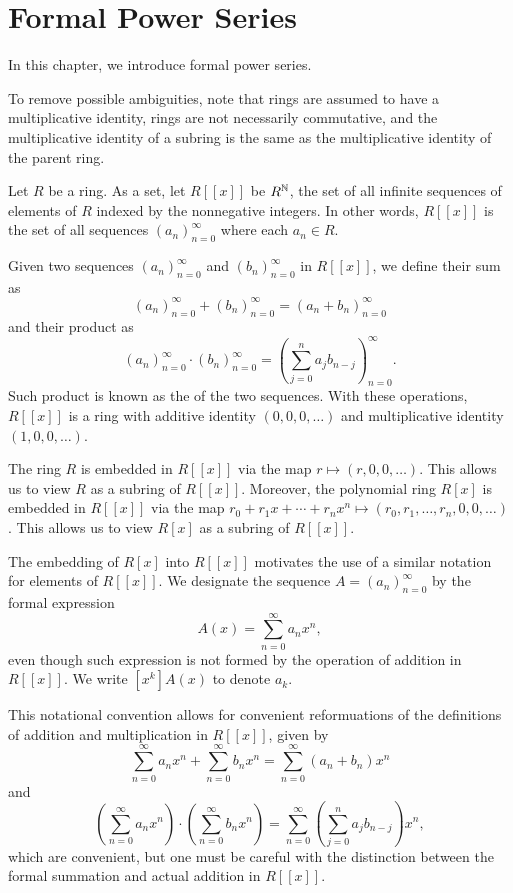 \chapter{Formal Power Series}

In this chapter, we introduce formal power series.

To remove possible ambiguities,
note that
rings are assumed to have a multiplicative identity,
rings are not necessarily commutative, and
the multiplicative identity of a subring is the same as the multiplicative identity of the parent ring.

Let \(R\) be a ring.
As a set, let \(R[[x]]\) be \(R^{\mathbb{N}}\), the set of all infinite sequences of elements of \(R\) indexed by the nonnegative integers.
In other words, \(R[[x]]\) is the set of all sequences \((a_n)_{n=0}^\infty\) where each \(a_n \in R\).

Given two sequences \((a_n)_{n=0}^\infty\) and \((b_n)_{n=0}^\infty\) in \(R[[x]]\), we define their sum as
\[
    (a_n)_{n=0}^\infty + (b_n)_{n=0}^\infty = (a_n + b_n)_{n=0}^\infty
\]
and their product as
\[
    (a_n)_{n=0}^\infty \cdot (b_n)_{n=0}^\infty = \left( \sum_{j=0}^n a_j b_{n-j} \right)_{n=0}^\infty.
\]
Such product is known as the  of the two sequences.
With these operations, \(R[[x]]\) is a ring with additive identity \((0, 0, 0, \dots)\) and multiplicative identity \((1, 0, 0, \dots)\).

The ring \(R\) is embedded in \(R[[x]]\) via the map \(r \mapsto (r, 0, 0, \dots)\).
This allows us to view \(R\) as a subring of \(R[[x]]\).
Moreover, the polynomial ring \(R[x]\) is embedded in \(R[[x]]\) via the map \(r_0 + r_1 x + \cdots + r_n x^n \mapsto (r_0, r_1, \dots, r_n, 0, 0, \dots)\).
This allows us to view \(R[x]\) as a subring of \(R[[x]]\).

The embedding of \(R[x]\) into \(R[[x]]\) motivates the use of a similar notation for elements of \(R[[x]]\).
We designate the sequence \(A = (a_n)_{n=0}^\infty\) by the formal expression
\begin{equation*}
    A(x) = \sum_{n=0}^\infty a_n x^n,
\end{equation*}
even though such expression is not formed by the operation of addition in \(R[[x]]\).
We write \([x^k]A(x)\) to denote \(a_k\).

This notational convention allows for convenient reformuations of the definitions of addition and multiplication in \(R[[x]]\), given by
\begin{equation*}
    \sum_{n=0}^\infty a_n x^n + \sum_{n=0}^\infty b_n x^n = \sum_{n=0}^\infty (a_n + b_n) x^n
\end{equation*}
and
\begin{equation*}
    \left( \sum_{n=0}^\infty a_n x^n \right) \cdot \left( \sum_{n=0}^\infty b_n x^n \right) = \sum_{n=0}^\infty \left( \sum_{j=0}^n a_j b_{n-j} \right) x^n,
\end{equation*}
which are convenient, but one must be careful with the distinction between the formal summation and actual addition in \(R[[x]]\).

